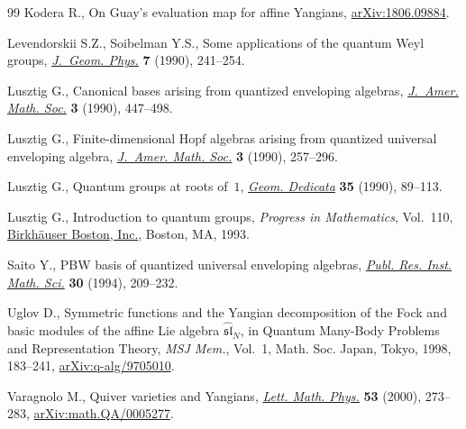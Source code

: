 \documentclass[pdftex]{sigma}
\theoremstyle{definition}
\numberwithin{equation}{section}
\begin{document}
\begin{thebibliography}{99}
Kodera R., On Guay's evaluation map for affine {Y}angians, \href{https://arxiv.org/abs/1806.09884}{arXiv:1806.09884}.

Levendorskii S.Z., Soibelman Y.S., Some applications of the quantum {W}eyl
 groups, \href{https://doi.org/10.1016/0393-0440(90)90013-S}{\textit{J.~Geom. Phys.}} \textbf{7} (1990), 241--254.

Lusztig G., Canonical bases arising from quantized enveloping algebras,
 \href{https://doi.org/10.2307/1990961}{\textit{J.~Amer. Math. Soc.}} \textbf{3} (1990), 447--498.

Lusztig G., Finite-dimensional {H}opf algebras arising from quantized universal
 enveloping algebra, \href{https://doi.org/10.2307/1990988}{\textit{J.~Amer. Math. Soc.}} \textbf{3} (1990), 257--296.

Lusztig G., Quantum groups at roots of~{$1$}, \href{https://doi.org/10.1007/BF00147341}{\textit{Geom. Dedicata}}
 \textbf{35} (1990), 89--113.

Lusztig G., Introduction to quantum groups, \textit{Progress in Mathematics},
 Vol.~110, \href{https://doi.org/10.1007/978-0-8176-4717-9}{Birkh\"{a}user Boston, Inc.}, Boston, MA, 1993.

Saito Y., P{BW} basis of quantized universal enveloping algebras, \href{https://doi.org/10.2977/prims/1195166130}{\textit{Publ.
 Res. Inst. Math. Sci.}} \textbf{30} (1994), 209--232.

Uglov D., Symmetric functions and the {Y}angian decomposition of the {F}ock and
 basic modules of the affine {L}ie algebra {$\widehat{\mathfrak{sl}}_N$}, in
 Quantum Many-Body Problems and Representation Theory, \textit{MSJ Mem.},
 Vol.~1, Math. Soc. Japan, Tokyo, 1998, 183--241, \href{https://arxiv.org/abs/q-alg/9705010}{arXiv:q-alg/9705010}.

Varagnolo M., Quiver varieties and {Y}angians, \href{https://doi.org/10.1023/A:1007674020905}{\textit{Lett. Math. Phys.}}
 \textbf{53} (2000), 273--283, \href{https://arxiv.org/abs/math.QA/0005277}{arXiv:math.QA/0005277}.

\end{thebibliography}\LastPageEnding
\end{document}
